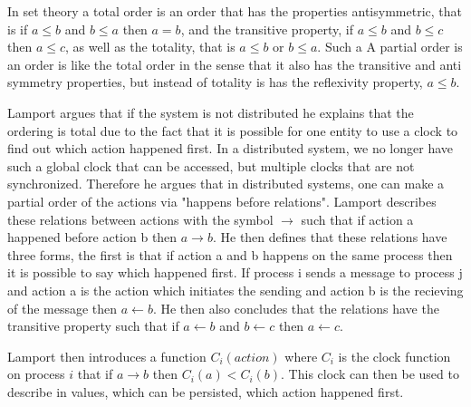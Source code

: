 		\newpar In set theory a total order is an order that has the properties antisymmetric, that is if $a \leq b$ and $b \leq a$ then $a = b$, and the transitive property, if $a \leq b$ and $b \leq c$ then $a \leq c$, as well as the totality, that is $a \leq b$ or $b \leq a$. Such a  A partial order is an order is like the total order in the sense that it also has the transitive and anti symmetry properties, but instead of totality is has the reflexivity property, $a \leq b$. 
		
		\newpar Lamport argues that if the system is not distributed he explains that the ordering is total due to the fact that it is possible for one entity to use a clock to find out which action happened first. In a distributed system, we no longer have such a global clock that can be accessed, but multiple clocks that are not synchronized. Therefore he argues that in distributed systems, one can make a partial order of the actions via "happens before relations". Lamport describes these relations between actions with the symbol $\rightarrow$ such that if action a happened before action b then $a \rightarrow b$. He then defines that these relations have three forms, the first is that if action a and b happens on the same process then it is possible to say which happened first. If process i sends a message to process j and action a is the action which initiates the sending and action b is the recieving of the message then $a \leftarrow b$. He then also concludes that the relations have the transitive property such that if $a \leftarrow b$ and $b \leftarrow c$ then $a \leftarrow c$. 
		
		\newpar Lamport then introduces a function $C_i(action)$ where $C_i$ is the clock function on process $i$ that if $a \rightarrow b$ then $C_i(a) < C_i(b)$. This clock can then be used to describe in values, which can be persisted, which action happened first.
		